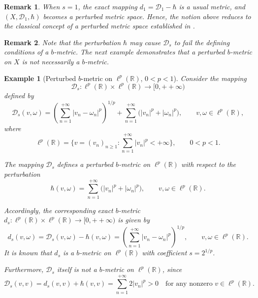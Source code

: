 \documentclass[sn-mathphys-num]{sn-jnl}%
\theoremstyle{thmstyleone}%
\theoremstyle{thmstyletwo}%
\newtheorem{example}{Example}%
\newtheorem{remark}{Remark}%
\theoremstyle{thmstylethree}%
\numberwithin{equation}{section}
\begin{document}
\vspace{0.2cm}
\begin{remark}
When $s=1$, the exact mapping $d_{1}=\mathcal{D}_{1}-\hbar$ is a usual metric, and $(X,\mathcal{D}_{1},\hbar)$ becomes a perturbed metric space. Hence, the notion above reduces to the classical concept of a perturbed metric space established in \cite{jleli}.
\end{remark}
\vspace{0.2cm}
\begin{remark}
Note that the perturbation $\hbar$ may cause $\mathcal{D}_{s}$ to fail the 
defining conditions of a $b$-metric. The next example demonstrates that a perturbed 
$b$-metric on $X$ is not necessarily a $b$-metric.
\end{remark}
\vspace{0.2cm}


\begin{example}[Perturbed $b$-metric on $\ell^{p}(\mathbb{R})$, $0<p<1$]
Consider the mapping 
\[
\mathcal{D}_{s}:\ell^{p}(\mathbb{R})\times \ell^{p}(\mathbb{R})\rightarrow [0,++\infty)
\]
defined by
\[
\mathcal{D}_{s}(v,\omega)
=
\left( \sum_{n=1}^{+\infty} |v_{n}-\omega_{n}|^{p} \right)^{1/p}
+
\sum_{n=1}^{+\infty} \big( |v_{n}|^{p} + |\omega_{n}|^{p} \big),
\qquad v,\omega \in \ell^{p}(\mathbb{R}),
\]
where 
\[
\ell^{p}(\mathbb{R})
=
\Big\{
v=(v_{n})_{n\ge 1} : \sum_{n=1}^{+\infty} |v_{n}|^{p} < +\infty
\Big\},
\qquad 0<p<1.
\]

The mapping $\mathcal{D}_{s}$ defines a perturbed $b$-metric on $\ell^{p}(\mathbb{R})$ 
with respect to the perturbation 
\[
\hbar(v,\omega)
=
\sum_{n=1}^{+\infty} \big( |v_{n}|^{p} + |\omega_{n}|^{p} \big),
\qquad 
v,\omega \in \ell^{p}(\mathbb{R}).
\]

Accordingly, the corresponding exact $b$-metric 
$d_{s}:\ell^{p}(\mathbb{R})\times \ell^{p}(\mathbb{R})\rightarrow [0,++\infty)$ 
is given by
\[
d_{s}(v,\omega)
=
\mathcal{D}_{s}(v,\omega) - \hbar(v,\omega)
=
\left( \sum_{n=1}^{+\infty} |v_{n}-\omega_{n}|^{p} \right)^{1/p},
\qquad v,\omega \in \ell^{p}(\mathbb{R}).
\]
It is known that $d_{s}$ is a $b$-metric on $\ell^{p}(\mathbb{R})$ with coefficient 
$s = 2^{1/p}$.

Furthermore, $\mathcal{D}_{s}$ itself is not a $b$-metric on $\ell^{p}(\mathbb{R})$, since
\[
\mathcal{D}_{s}(v,v)
=
d_{s}(v,v) + \hbar(v,v)
=
\sum_{n=1}^{+\infty} 2|v_{n}|^{p} > 0
\quad\text{for any nonzero } v\in \ell^{p}(\mathbb{R}).
\]
\end{example}
\end{document}

